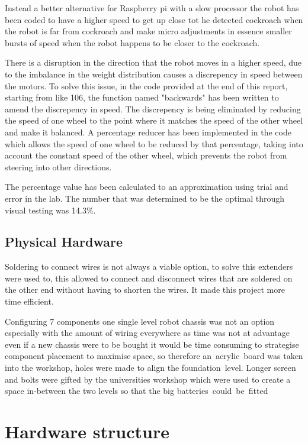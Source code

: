\documentclass[11pt]{article}
\begin{document}
Instead a better alternative for Raspberry pi with a slow processor the robot has been coded to have a higher speed to get up close tot he detected cockroach when the robot is far from cockroach and make micro adjustments in essence smaller bursts of speed when the robot happens to be closer to the cockroach.

There is a disruption in the direction that the robot moves in a higher speed, due to the imbalance in the weight distribution causes a discrepency in speed between the motors. To solve this issue, in the code provided at the end of this report, starting from like 106, the function named "backwards" has been written to amend the discrepency in speed. The discrepency is being eliminated by reducing the speed of one wheel to the point where it matches the speed of the other wheel and make it balanced. A percentage reducer has been implemented in the code which allows the speed of one wheel to be reduced by that percentage, taking into account the constant speed of the other wheel, which prevents the robot from steering into other directions.

The percentage value has been calculated to an approximation using trial and error in the lab. The number that was determined to be the optimal through visual testing was 14.3\%.



	
	\subsection{	Physical Hardware    }
	 Soldering to connect wires is not always a viable option, to solve this extenders were used to, this allowed to connect and disconnect wires that are soldered on the other end without having to shorten the wires. It made this project more time efficient.
	
	Configuring 7 components one  single level robot chassis was not an option especially with the amount of wiring everywhere as time was not at advantage even if a new chassis were to be bought it would be time consuming to strategise component placement to maximise space, so therefore an acrylic board was taken into the workshop, holes were made to align the foundation level. Longer screen and bolts were gifted by the universities workshop which were used to create a space in-between the two levels so that the big batteries could be fitted
	
	
	
	\section{Hardware structure}
	
\end{document}
